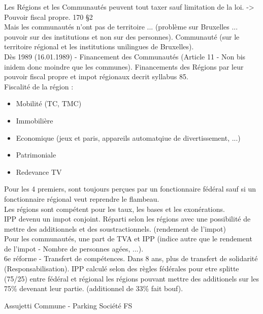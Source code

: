 \documentclass{book}
\begin{document}
Les Régions et les Communautés peuvent tout taxer sauf limitation de la loi. -> Pouvoir fiscal propre. 170 §2\\ 

Mais les communautés n'ont pas de territoire ... (problème sur Bruxelles ... pouvoir sur des institutions et non sur des personnes). Communauté (sur le territoire régional et les institutions unilingues de Bruxelles).\\

Dès 1989 (16.01.1989) - Financement des Communautés (Article 11 - Non bis inidem donc moindre que les communes). Financements des Régions par leur pouvoir fiscal propre et impot régionaux decrit syllabus 85.\\

Fiscalité de la région :
\begin{itemize}
\item Mobilité (TC, TMC)
\item Immobilière
\item Economique (jeux et paris, appareils automatqiue de divertissement, ...)
\item Patrimoniale
\item Redevance TV
\end{itemize}
\null

Pour les 4 premiers, sont toujours perçues par un fonctionnaire fédéral sauf si un fonctionnaire régional veut reprendre le flambeau.\\

Les régions sont compétent pour les taux, les bases et les exonérations.\\

IPP devenu un impot conjoint. Réparti selon les régions avec une possibilité de mettre des additionnels et des soustractionnels. (rendement de l'impot)\\

Pour les communautés, une part de TVA et IPP (indice autre que le rendement de l'impot - Nombre de personnes agées, ...).\\


6e réforme - Transfert de compétences. Dans 8 ans, plus de transfert de solidarité (Responsabilisation). IPP calculé selon des règles fédérales pour etre splitte (75/25) entre fédéral et régional les régions pouvant mettre des additionels sur les 75\% devenant leur partie. (additionnel de 33\% fait bouf). 


Assujetti Commune - Parking
Société FS

\nocite{*}

\end{document}
